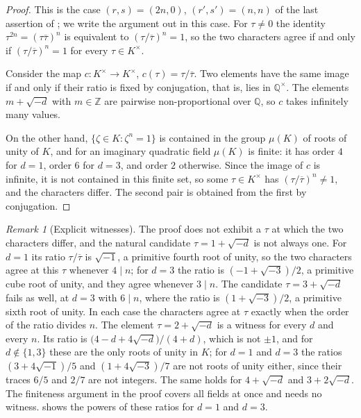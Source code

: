 \documentclass[11pt,reqno]{amsart}
\theoremstyle{plain}
\theoremstyle{definition}
\theoremstyle{remark}
\newtheorem{remark}[theorem]{Remark}
\newcommand{\QQ}{\mathbb{Q}}
\newcommand{\ZZ}{\mathbb{Z}}
\newcommand{\Kx}{K^{\times}}
\newcommand{\bbar}[1]{\overline{#1}}
\begin{document}
\begin{proof}
This is the case $(r,s)=(2n,0)$, $(r',s')=(n,n)$ of the last assertion of
; we write the argument out in this case. For $\tau\ne0$
the identity $\tau^{2n}=(\tau\bbar{\tau})^{n}$ is equivalent to
$(\tau/\bbar{\tau})^{n}=1$, so the two characters agree if and only if
$(\tau/\bbar{\tau})^{n}=1$ for every $\tau\in\Kx$.

Consider the map $c\colon\Kx\to\Kx$, $c(\tau)=\tau/\bbar{\tau}$. Two elements
have the same image if and only if their ratio is fixed by conjugation, that
is, lies in $\QQ^{\times}$. The elements $m+\sqrt{-d}$ with $m\in\ZZ$ are
pairwise non-proportional over $\QQ$, so $c$ takes infinitely many values.

On the other hand, $\{\zeta\in K:\zeta^{n}=1\}$ is contained in the group
$\mu(K)$ of roots of unity of $K$, and for an imaginary quadratic field
$\mu(K)$ is finite: it has order $4$ for $d=1$, order $6$ for $d=3$, and order
$2$ otherwise. Since the image of $c$ is infinite, it is not contained in this
finite set, so some $\tau\in\Kx$ has $(\tau/\bbar{\tau})^{n}\ne1$, and the
characters differ. The second pair is obtained from the first by conjugation.
\end{proof}

\begin{remark}[Explicit witnesses]\label{rem:witness}
The proof does not exhibit a $\tau$ at which the two characters differ, and
the natural candidate $\tau=1+\sqrt{-d}$ is not always one. For $d=1$ its
ratio $\tau/\bbar{\tau}$ is $\sqrt{-1}$, a primitive fourth root of unity, so
the two characters agree at this $\tau$ whenever $4\mid n$; for $d=3$ the
ratio is $(-1+\sqrt{-3})/2$, a primitive cube root of unity, and they agree
whenever $3\mid n$. The candidate $\tau=3+\sqrt{-d}$ fails as well, at $d=3$
with $6\mid n$, where the ratio is $(1+\sqrt{-3})/2$, a primitive sixth root of
unity. In each case the characters agree at $\tau$ exactly when the order of
the ratio divides $n$. The element $\tau=2+\sqrt{-d}$ is a witness for every $d$
and every $n$. Its ratio is $\bigl(4-d+4\sqrt{-d}\bigr)/(4+d)$, which is not
$\pm1$, and for $d\notin\{1,3\}$ these are the only roots of unity in $K$;
for $d=1$ and $d=3$ the ratios $(3+4\sqrt{-1})/5$ and $(1+4\sqrt{-3})/7$ are
not roots of unity either, since their traces $6/5$ and $2/7$ are not
integers. The same holds for $4+\sqrt{-d}$ and $3+2\sqrt{-d}$. The finiteness
argument in the proof covers all fields at once and needs no witness.  shows the powers of these ratios for $d=1$ and $d=3$.
\end{remark}
\end{document}
